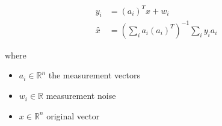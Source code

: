 \documentclass[12pt]{article}
\begin{document}
\begin{align*}
\textit{y}_{ \textit{i} } & = \left( \textit{a}_{ \textit{i} } \right)^T\textit{x} + \textit{w}_{ \textit{i} } \\
\textit{x̂} & = \left( \sum_\textit{i} \textit{a}_{ \textit{i} }\left( \textit{a}_{ \textit{i} } \right)^T \right)^{-1}\sum_\textit{i} \textit{y}_{ \textit{i} }\textit{a}_{ \textit{i} }
\end{align*}

where
\begin{itemize}
\item $\textit{a}_{\textit{i}} \in \mathbb{R}^{ \textit{n}}$ the measurement vectors  
\item $\textit{w}_{\textit{i}} \in \mathbb{{R}}$ measurement noise 
\item $\textit{x} \in \mathbb{R}^{ \textit{n}}$ original vector 
\end{itemize}
\end{document}
